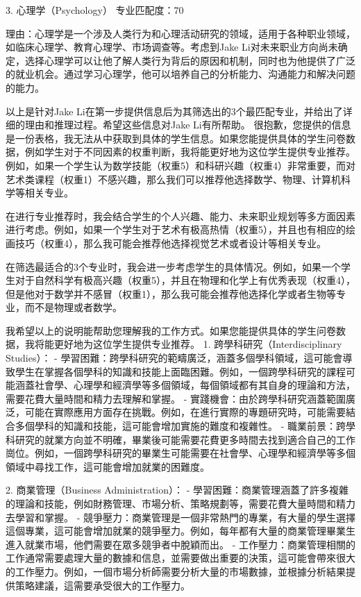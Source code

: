 \documentclass{extarticle}
\begin{document}
\begin{CJK*}{UTF8}{gbsn}
3. 心理学（Psychology）
专业匹配度：70

理由：心理学是一个涉及人类行为和心理活动研究的领域，适用于各种职业领域，如临床心理学、教育心理学、市场调查等。考虑到Jake Li对未来职业方向尚未确定，选择心理学可以让他了解人类行为背后的原因和机制，同时也为他提供了广泛的就业机会。通过学习心理学，他可以培养自己的分析能力、沟通能力和解决问题的能力。

以上是针对Jake Li在第一步提供信息后为其筛选出的3个最匹配专业，并给出了详细的理由和推理过程。希望这些信息对Jake Li有所帮助。
很抱歉，您提供的信息是一份表格，我无法从中获取到具体的学生信息。如果您能提供具体的学生问卷数据，例如学生对于不同因素的权重判断，我将能更好地为这位学生提供专业推荐。例如，如果一个学生认为数学技能（权重5）和科研兴趣（权重4）非常重要，而对艺术类课程（权重1）不感兴趣，那么我们可以推荐他选择数学、物理、计算机科学等相关专业。

在进行专业推荐时，我会结合学生的个人兴趣、能力、未来职业规划等多方面因素进行考虑。例如，如果一个学生对于艺术有极高热情（权重5），并且也有相应的绘画技巧（权重4），那么我可能会推荐他选择视觉艺术或者设计等相关专业。

在筛选最适合的3个专业时，我会进一步考虑学生的具体情况。例如，如果一个学生对于自然科学有极高兴趣（权重5），并且在物理和化学上有优秀表现（权重4），但是他对于数学并不感冒（权重1），那么我可能会推荐他选择化学或者生物等专业，而不是物理或者数学。

我希望以上的说明能帮助您理解我的工作方式。如果您能提供具体的学生问卷数据，我将能更好地为这位学生提供专业推荐。
1. 跨學科研究（Interdisciplinary Studies）：
    - 學習困難：跨學科研究的範疇廣泛，涵蓋多個學科領域，這可能會導致學生在掌握各個學科的知識和技能上面臨困難。例如，一個跨學科研究的課程可能涵蓋社會學、心理學和經濟學等多個領域，每個領域都有其自身的理論和方法，需要花費大量時間和精力去理解和掌握。
    - 實踐機會：由於跨學科研究涵蓋範圍廣泛，可能在實際應用方面存在挑戰。例如，在進行實際的專題研究時，可能需要結合多個學科的知識和技能，這可能會增加實施的難度和複雜性。
    - 職業前景：跨學科研究的就業方向並不明確，畢業後可能需要花費更多時間去找到適合自己的工作崗位。例如，一個跨學科研究的畢業生可能需要在社會學、心理學和經濟學等多個領域中尋找工作，這可能會增加就業的困難度。

2. 商業管理（Business Administration）：
    - 學習困難：商業管理涵蓋了許多複雜的理論和技能，例如財務管理、市場分析、策略規劃等，需要花費大量時間和精力去學習和掌握。
    - 競爭壓力：商業管理是一個非常熱門的專業，有大量的學生選擇這個專業，這可能會增加就業的競爭壓力。例如，每年都有大量的商業管理畢業生進入就業市場，他們需要在眾多競爭者中脫穎而出。
    - 工作壓力：商業管理相關的工作通常需要處理大量的數據和信息，並需要做出重要的決策，這可能會帶來很大的工作壓力。例如，一個市場分析師需要分析大量的市場數據，並根據分析結果提供策略建議，這需要承受很大的工作壓力。


\end{CJK*}
\end{document}
